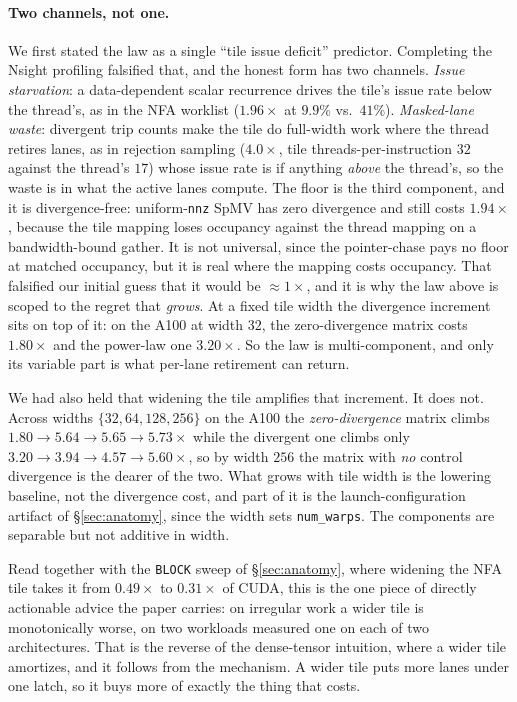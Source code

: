 \documentclass[sigplan,screen,review]{acmart}
\begin{document}
\paragraph{Two channels, not one.} We first stated the law as a single ``tile issue
deficit'' predictor. Completing the Nsight profiling falsified that, and the honest form has
two channels. \emph{Issue starvation}: a data-dependent scalar recurrence drives the tile's
issue rate below the thread's, as in the NFA worklist ($1.96\times$ at $9.9\%$ vs.\ $41\%$).
\emph{Masked-lane waste}: divergent trip counts make the tile do full-width work where the
thread retires lanes, as in rejection sampling ($4.0\times$, tile threads-per-instruction
$32$ against the thread's $17$) whose issue rate is if anything \emph{above} the thread's,
so the waste is in what the active lanes compute. The floor is the third component, and it is
divergence-free: uniform-\texttt{nnz} SpMV has zero divergence and still costs
$1.94\times$, because the tile mapping loses occupancy against the thread mapping on a
bandwidth-bound gather. It is not universal, since the pointer-chase pays no floor at
matched occupancy, but it is real where the mapping costs occupancy. That falsified our
initial guess that it would be ${\approx}1\times$, and it is why the law above is scoped
to the regret that \emph{grows}. At a fixed tile width the divergence increment sits on top
of it: on the A100 at width $32$, the zero-divergence matrix costs $1.80\times$ and the
power-law one $3.20\times$. So the law is multi-component, and only its variable part is
what per-lane retirement can return.

We had also held that widening the tile amplifies that increment. It does not. Across
widths $\{32,64,128,256\}$ on the A100 the \emph{zero-divergence} matrix climbs
$1.80\rightarrow5.64\rightarrow5.65\rightarrow5.73\times$ while the divergent one climbs
only $3.20\rightarrow3.94\rightarrow4.57\rightarrow5.60\times$, so by width $256$ the
matrix with \emph{no} control divergence is the dearer of the two. What grows with tile
width is the lowering baseline, not the divergence cost, and part of it is the
launch-configuration artifact of \S\ref{sec:anatomy}, since the width sets
\texttt{num\_warps}. The components are separable but not additive in width.

Read together with the \texttt{BLOCK} sweep of \S\ref{sec:anatomy}, where widening the
NFA tile takes it from $0.49\times$ to $0.31\times$ of CUDA, this is the one piece of
directly actionable advice the paper carries: on irregular work a wider tile is
monotonically worse, on two workloads measured one on each of two architectures. That is the reverse of the
dense-tensor intuition, where a wider tile amortizes, and it follows from the mechanism.
A wider tile puts more lanes under one latch, so it buys more of exactly the thing that
costs.
\end{document}
